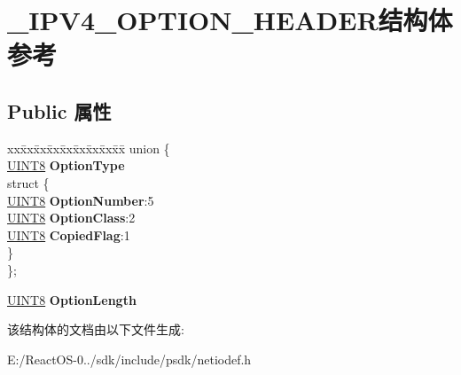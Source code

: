 \hypertarget{struct___i_p_v4___o_p_t_i_o_n___h_e_a_d_e_r}{}\section{\+\_\+\+I\+P\+V4\+\_\+\+O\+P\+T\+I\+O\+N\+\_\+\+H\+E\+A\+D\+E\+R结构体 参考}
\label{struct___i_p_v4___o_p_t_i_o_n___h_e_a_d_e_r}
\subsection*{Public 属性}
\begin{DoxyCompactItemize}
\item 
\mbox{\label{struct___i_p_v4___o_p_t_i_o_n___h_e_a_d_e_r_aa256cd0ce936a2ee9c9690c40a0851ea}} 
\begin{tabbing}
xx\=xx\=xx\=xx\=xx\=xx\=xx\=xx\=xx\=\kill
union \{\\
\>\hyperlink{_processor_bind_8h_ab27e9918b538ce9d8ca692479b375b6a}{UINT8} {\bfseries OptionType}\\
\mbox{\label{union___i_p_v4___o_p_t_i_o_n___h_e_a_d_e_r_1_1_0D2639_a5b6cd0c2f5536d0cb0154e46bc008f65}} 
\>struct \{\\
\>\>\hyperlink{_processor_bind_8h_ab27e9918b538ce9d8ca692479b375b6a}{UINT8} {\bfseries OptionNumber}:5\\
\>\>\hyperlink{_processor_bind_8h_ab27e9918b538ce9d8ca692479b375b6a}{UINT8} {\bfseries OptionClass}:2\\
\>\>\hyperlink{_processor_bind_8h_ab27e9918b538ce9d8ca692479b375b6a}{UINT8} {\bfseries CopiedFlag}:1\\
\>\} \\
\}; \\

\end{tabbing}\item 
\mbox{\label{struct___i_p_v4___o_p_t_i_o_n___h_e_a_d_e_r_aaa82f244225db44c91f157784ef9e9f0}} 
\hyperlink{_processor_bind_8h_ab27e9918b538ce9d8ca692479b375b6a}{U\+I\+N\+T8} {\bfseries Option\+Length}
\end{DoxyCompactItemize}


该结构体的文档由以下文件生成\+:\begin{DoxyCompactItemize}
\item 
E\+:/\+React\+O\+S-\/0../sdk/include/psdk/netiodef.\+h\end{DoxyCompactItemize}
